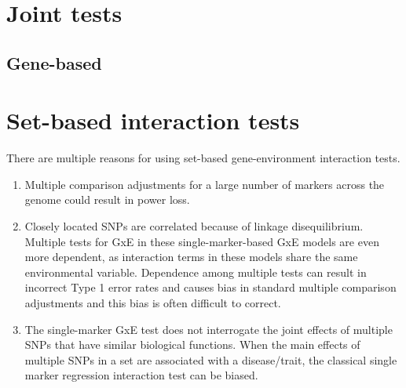 \documentclass[]{book}
\providecommand{\tightlist}{%
  \setlength{\itemsep}{0pt}\setlength{\parskip}{0pt}}
\theoremstyle{definition}
\theoremstyle{definition}
\theoremstyle{definition}
\theoremstyle{remark}
\begin{document}
\section{Joint tests}\label{joint-tests}

\subsection{Gene-based}\label{gene-based}

\section{Set-based interaction tests}\label{set-based-interaction-tests}

There are multiple reasons for using set-based gene-environment
interaction tests.

\begin{enumerate}
\def\labelenumi{\arabic{enumi}.}
\tightlist
\item
  Multiple comparison adjustments for a large number of markers across
  the genome could result in power loss.
\item
  Closely located SNPs are correlated because of linkage disequilibrium.
  Multiple tests for GxE in these single-marker-based GxE models are
  even more dependent, as interaction terms in these models share the
  same environmental variable. Dependence among multiple tests can
  result in incorrect Type 1 error rates and causes bias in standard
  multiple comparison adjustments and this bias is often difficult to
  correct.
\item
  The single-marker GxE test does not interrogate the joint effects of
  multiple SNPs that have similar biological functions. When the main
  effects of multiple SNPs in a set are associated with a disease/trait,
  the classical single marker regression interaction test can be biased.
\end{enumerate}
\end{document}
